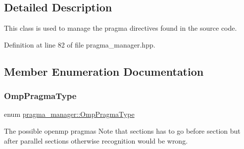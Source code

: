 \subsection{Detailed Description}
This class is used to manage the pragma directives found in the source code. 

Definition at line 82 of file pragma\+\_\+manager.\+hpp.



\subsection{Member Enumeration Documentation}
\mbox{\label{classpragma__manager_a181a86a91d4331ed5c884f9cec850238}} 
\subsubsection{\texorpdfstring{Omp\+Pragma\+Type}{OmpPragmaType}}
{\footnotesize\ttfamily enum \hyperlink{classpragma__manager_a181a86a91d4331ed5c884f9cec850238}{pragma\+\_\+manager\+::\+Omp\+Pragma\+Type}}



The possible openmp pragmas Note that sections has to go before section but after parallel sections otherwise recognition would be wrong. 

